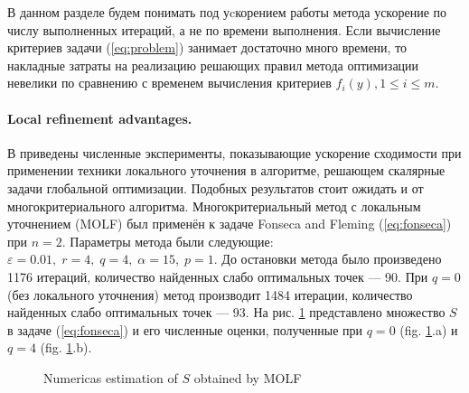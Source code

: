 \documentclass{llncs}
\begin{document}
В данном разделе будем понимать под уcкорением работы метода ускорение по числу выполненных итераций, а не по времени выполнения. Если вычисление критериев задачи (\ref{eq:problem}) занимает достаточно много времени, то накладные затраты на реализацию решающих правил метода оптимизации невелики по сравнению с временем вычисления критериев \(f_i(y), 1\leqslant i\leqslant m\).

\paragraph{Local refinement advantages.} В \cite{barkalovLebedev2016} приведены численные эксперименты, показывающие ускорение сходимости при применении техники локального уточнения в алгоритме, решающем скалярные задачи глобальной оптимизации. Подобных результатов стоит ожидать и от многокритериального алгоритма. Многокритериальный метод с локальным уточнением (MOLF) был применён к задаче Fonseca and Fleming (\ref{eq:fonseca}) при \(n=2\). Параметры метода были следующие: \(\varepsilon=0.01,\;r=4,\;q=4,\;\alpha=15,\;p=1\). До остановки метода было произведено 1176 итераций, количество найденных слабо оптимальных точек --- 90. При \(q=0\) (без локального уточнения) метод производит 1484 итерации, количество найденных слабо оптимальных точек --- 93. На рис. \ref{fig:fonseca_slater} представлено множество \(S\) в задаче (\ref{eq:fonseca}) и его численные оценки, полученные при \(q=0\) (fig. \ref{fig:fonseca_slater}.a) и \(q=4\) (fig. \ref{fig:fonseca_slater}.b).

\begin{figure}[ht]
    \centering
    \caption{Numericas estimation of \(S\) obtained by MOLF}
    \label{fig:fonseca_slater}
\end{figure}
\end{document}
